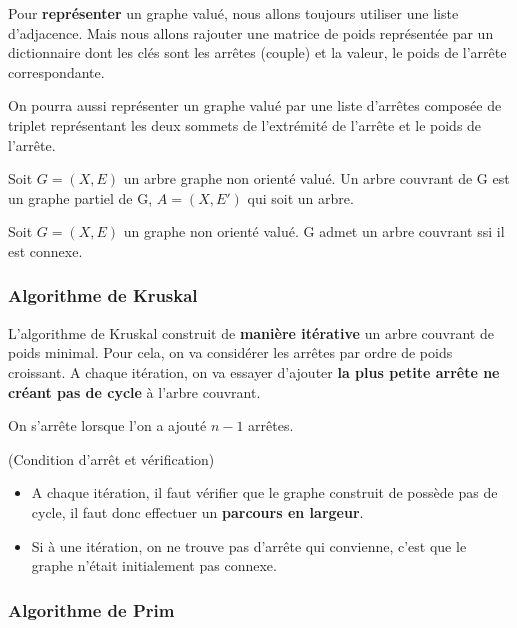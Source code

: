 Pour \textbf{représenter} un graphe valué, nous allons toujours utiliser une liste d'adjacence. 
Mais nous allons rajouter une matrice de poids représentée par un dictionnaire dont les clés sont les arrêtes (couple)
et la valeur, le poids de l'arrête correspondante. 

On pourra aussi représenter un graphe valué par une liste d'arrêtes composée de triplet représentant les deux sommets de l'extrémité 
de l'arrête et le poids de l'arrête. 

\begin{definition}
    Soit $G = (X,E)$ un arbre graphe non orienté valué. 
    Un arbre couvrant de G est un graphe partiel de G, $A = (X,E')$ qui soit un arbre. 
\end{definition}

\begin{theorem}
    Soit $G = (X,E)$ un graphe non orienté valué. G admet un arbre couvrant ssi il est connexe. 
\end{theorem}


\subsubsection{Algorithme de Kruskal}

L'algorithme de Kruskal construit de \textbf{manière itérative} un arbre couvrant de poids minimal. 
Pour cela, on va considérer les arrêtes par ordre de poids croissant. A chaque itération, on va essayer d'ajouter 
\textbf{la plus petite arrête ne créant pas de cycle} à l'arbre couvrant. 

On s'arrête lorsque l'on a ajouté $n-1$ arrêtes. 

\begin{remark} (Condition d'arrêt et vérification)
    \begin{itemize}
        \item A chaque itération, il faut vérifier que le graphe construit de possède pas de cycle, il faut donc effectuer 
            un \textbf{parcours en largeur}. 
        \item Si à une itération, on ne trouve pas d'arrête qui convienne, c'est que le graphe n'était initialement pas connexe. 
    \end{itemize}
\end{remark}

\subsubsection{Algorithme de Prim}

